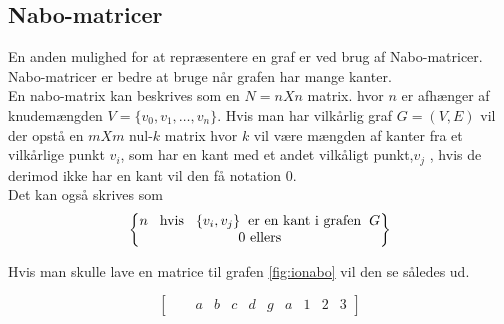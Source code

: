 \subsection{Nabo-matricer}
En anden mulighed for at repræsentere en graf er ved brug af Nabo-matricer. Nabo-matricer er bedre at bruge når grafen har mange kanter.\\
En nabo-matrix kan beskrives som en $N=n X n$ matrix. hvor $n$ er afhænger af knudemængden $V=\{v_0, v_1, \ldots, v_n\}$. Hvis man har vilkårlig graf $G=(V,E)$ vil der opstå en $m X m$ nul-$k$ matrix hvor $k$ vil være mængden af kanter fra et vilkårlige punkt $v_i$, som har en kant med et andet vilkåligt punkt,$v_j$ , hvis de derimod ikke har en kant vil den få notation 0. \\

Det kan også skrives som \\

\begin{equation}
\begin{Bmatrix} 
	 n \hspace{0.3cm}\textrm{hvis} \hspace{0.3cm}\{v_i,v_j\} \hspace{0.2cm} \textrm{er en kant i grafen} \hspace{0.2cm} G \\
	 \textrm{0 ellers} \\
	\end{Bmatrix}
\end{equation}

Hvis man skulle lave en matrice til grafen \ref{fig:ionabo} vil den se således ud.

\begin{equation}
	\begin{bmatrix}
	& & a&b&c&d&g
	&a&1&2&3
	\end{bmatrix} 
\end{equation}
	

